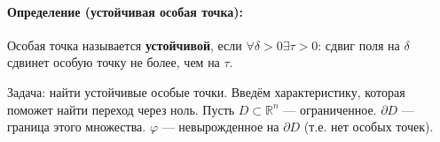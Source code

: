 \paragraph{Определение (устойчивая особая точка):} Особая точка называется \textbf{устойчивой}, если $\forall \delta > 0 \exists \tau > 0$: сдвиг поля на $\delta$ сдвинет особую точку не более, чем на $\tau$.

Задача: найти устойчивые особые точки.
Введём характеристику, которая поможет найти переход через ноль.
Пусть $D \subset \mathbb{R}^n$ --- ограниченное. $\partial D$ --- граница этого множества. $\varphi$ --- невырожденное на $\partial D$ (т.е. нет особых точек).